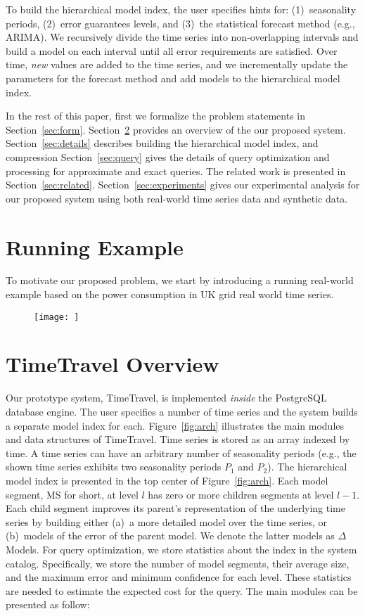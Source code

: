 \documentclass[10pt,conference,letterpaper]{IEEEtran}
\newcommand{\LNs}{hierarchical model index }
\begin{document}
To build the hierarchical model index, the user specifies hints for: (1)~seasonality periods, (2)~error guarantees levels, and (3)~the statistical forecast method (e.g., ARIMA).  
We recursively divide the time series into non-overlapping intervals and build a model on each interval until all error requirements are satisfied. 
Over time, {\it new} values are added to the time series, and we incrementally update the parameters for the forecast method and add  models to the hierarchical model index.


In the rest of this paper, first we formalize the problem statements in Section~\ref{sec:form}.   Section~\ref{sec:overview} provides an overview of the our proposed system. Section~\ref{sec:details} describes building the hierarchical model index, and  compression Section~\ref{sec:query} gives the details of query optimization and processing for approximate and exact queries.  The  related work is presented in Section~\ref{sec:related}. Section~\ref{sec:experiments} gives  our experimental analysis for our proposed system   using  both real-world time series data and synthetic data.

\section{Running Example}
To motivate our proposed problem, we start by introducing a running real-world example based on the power consumption in UK grid real world time series.
\begin{figure}
\texttt{[image: ]}
\end{figure}
\section{TimeTravel Overview}
\label{sec:overview}
Our prototype  system, TimeTravel, is implemented {\em inside} the PostgreSQL database engine.  The user specifies a number of time series and the system builds a separate model index for each. Figure~\ref{fig:arch} illustrates the main modules and data structures of TimeTravel. {Time series} is stored as an array indexed by time. A time series can have an arbitrary number of seasonality periods (e.g., the shown time series exhibits two seasonality periods $P_1$ and $P_2$). The \LNs is presented in the top center of Figure~\ref{fig:arch}. Each model segment, MS for short, at level $l$ has zero or more children segments at level $l-1$.  Each child segment improves its parent's representation of the underlying time series by building either (a)~a more detailed model over the time series, 
or (b)~models of the error of the parent model. We denote the latter models as $\Delta$Models. 
For query optimization, we store statistics about the index in the system catalog. Specifically, we store the number of model segments, their average size, and the maximum error and minimum confidence for each level. These statistics are needed to estimate the expected cost for the query.
The main modules  can be presented as follow:
\end{document}
